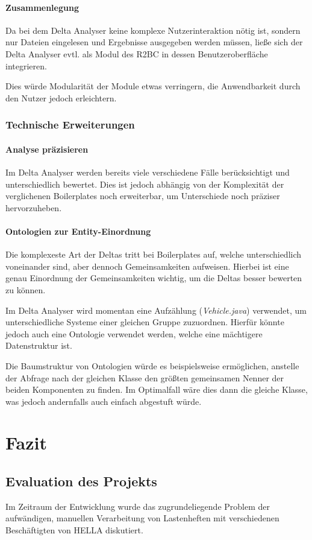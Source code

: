 \documentclass[12pt]{report}
\begin{document}
\subsubsection{Zusammenlegung}
Da bei dem Delta Analyser keine komplexe Nutzerinteraktion nötig ist, sondern nur Dateien eingelesen und Ergebnisse ausgegeben werden müssen, ließe sich der Delta Analyser evtl. als Modul des R2BC in dessen Benutzeroberfläche integrieren. 

Dies würde Modularität der Module etwas verringern, die Anwendbarkeit durch den Nutzer jedoch erleichtern.
\subsection{Technische Erweiterungen}
\subsubsection{Analyse präzisieren}
Im Delta Analyser werden bereits viele verschiedene Fälle berücksichtigt und unterschiedlich bewertet. Dies ist jedoch abhängig von der Komplexität der verglichenen Boilerplates noch erweiterbar, um Unterschiede noch präziser hervorzuheben. 
\subsubsection{Ontologien zur Entity-Einordnung}
Die komplexeste Art der Deltas tritt bei Boilerplates auf, welche unterschiedlich voneinander sind, aber dennoch Gemeinsamkeiten aufweisen. Hierbei ist eine genau Einordnung der Gemeinsamkeiten wichtig, um die Deltas besser bewerten zu können. 

Im Delta Analyser wird momentan eine Aufzählung (\textit{Vehicle.java}) verwendet, um unterschiedliche Systeme einer gleichen Gruppe zuzuordnen. Hierfür könnte jedoch auch eine Ontologie verwendet werden, welche eine mächtigere Datenstruktur ist. 

Die Baumstruktur von Ontologien würde es beispielsweise ermöglichen, anstelle der Abfrage nach der gleichen Klasse den \glqq größten gemeinsamen Nenner\grqq{} der beiden Komponenten zu finden. Im Optimalfall wäre dies dann die gleiche Klasse, was jedoch andernfalls auch einfach abgestuft würde.

\chapter{Fazit}
\section{Evaluation des Projekts}
Im Zeitraum der Entwicklung wurde das zugrundeliegende Problem der aufwändigen, manuellen Verarbeitung von Lastenheften mit verschiedenen Beschäftigten von HELLA diskutiert. 
\end{document}
